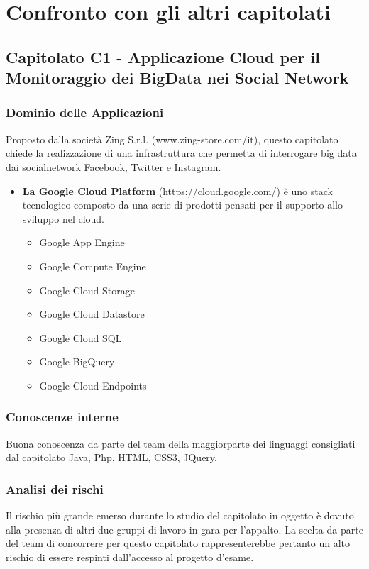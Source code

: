 \section{Confronto con gli altri capitolati}
\subsection{Capitolato C1 - Applicazione Cloud per il Monitoraggio dei
	BigData nei Social Network}
  \subsubsection{Dominio delle Applicazioni}
  Proposto dalla società Zing S.r.l. (www.zing-store.com/it), questo capitolato chiede la realizzazione di una infrastruttura che permetta di interrogare big data dai socialnetwork Facebook, Twitter e Instagram.
  \begin{itemize}
  	\item \textbf{La Google Cloud Platform} (https://cloud.google.com/) è uno stack tecnologico composto da una serie di prodotti pensati per il supporto allo sviluppo nel cloud.
  	\begin{itemize}
  		\item Google App Engine
  		\item Google Compute Engine
        \item Google Cloud Storage
  		\item Google Cloud Datastore
  		\item Google Cloud SQL
  		\item Google BigQuery
  		\item Google Cloud Endpoints
  	\end{itemize}
  \end{itemize}
  \subsubsection{Conoscenze interne}
  Buona conoscenza da parte del team della maggiorparte dei linguaggi consigliati dal capitolato Java, Php, HTML, CSS3, JQuery.
  \subsubsection{Analisi dei rischi}
  Il rischio più grande emerso durante lo studio del capitolato in oggetto è dovuto alla presenza di altri due gruppi di lavoro in gara per l'appalto. La scelta da parte del team di concorrere per questo capitolato rappresenterebbe pertanto un alto rischio di essere respinti dall'accesso al progetto d'esame.
